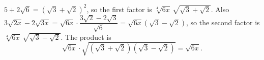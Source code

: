 $5+2\sqrt6=\left(\sqrt3+\sqrt2\right)^2$, so the first factor is $\sqrt[4]{6x}\,\sqrt{\sqrt3+\sqrt2}$. Also $3\sqrt{2x}-2\sqrt{3x}=\sqrt{6x}\cdot\dfrac{3\sqrt2-2\sqrt3}{\sqrt6}=\sqrt{6x}\left(\sqrt3-\sqrt2\right)$, so the second factor is $\sqrt[4]{6x}\,\sqrt{\sqrt3-\sqrt2}$. The product is
\[\sqrt{6x}\cdot\sqrt{\left(\sqrt3+\sqrt2\right)\left(\sqrt3-\sqrt2\right)}=\boxed{\sqrt{6x}}.\]
